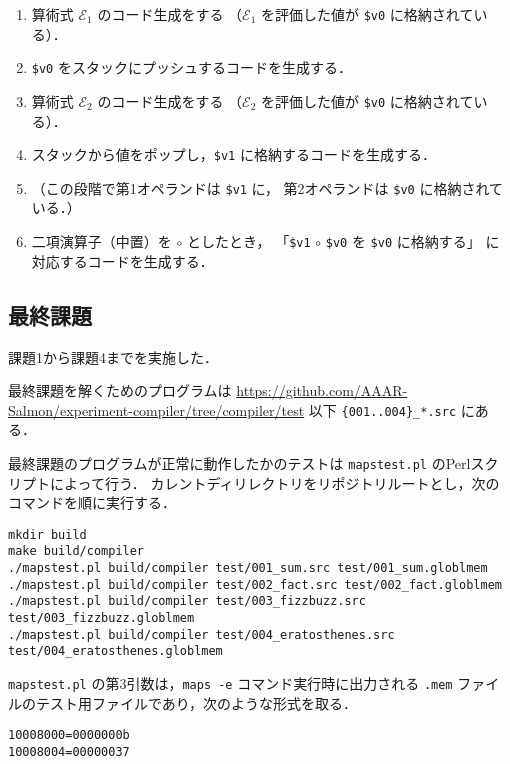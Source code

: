 \documentclass[lualatex, a4paper, ja=standard]{bxjsarticle}
\begin{document}
\begin{enumerate}
  \item 算術式 $\mathcal{E}_1$ のコード生成をする
  （$\mathcal{E}_1$ を評価した値が \verb|$v0| に格納されている）．
  \item \verb|$v0| をスタックにプッシュするコードを生成する．
  \item 算術式 $\mathcal{E}_2$ のコード生成をする
  （$\mathcal{E}_2$ を評価した値が \verb|$v0| に格納されている）．
  \item スタックから値をポップし，\verb|$v1| に格納するコードを生成する．
  \item （この段階で第1オペランドは \verb|$v1| に，
  第2オペランドは \verb|$v0| に格納されている．）
  \item 二項演算子（中置）を $\circ$ としたとき，
  「\verb|$v1| $\circ$ \verb|$v0| を \verb|$v0| に格納する」
  に対応するコードを生成する．
\end{enumerate}

\subsection{最終課題}

課題1から課題4までを実施した．

最終課題を解くためのプログラムは
\url{https://github.com/AAAR-Salmon/experiment-compiler/tree/compiler/test}
以下 \verb|{001..004}_*.src| にある．

最終課題のプログラムが正常に動作したかのテストは
\verb|mapstest.pl| のPerlスクリプトによって行う．
カレントディリレクトリをリポジトリルートとし，次のコマンドを順に実行する．
\begin{Verbatim}[frame=lines]
mkdir build
make build/compiler
./mapstest.pl build/compiler test/001_sum.src test/001_sum.globlmem
./mapstest.pl build/compiler test/002_fact.src test/002_fact.globlmem
./mapstest.pl build/compiler test/003_fizzbuzz.src test/003_fizzbuzz.globlmem
./mapstest.pl build/compiler test/004_eratosthenes.src test/004_eratosthenes.globlmem
\end{Verbatim}

\verb|mapstest.pl| の第3引数は，\verb|maps -e| コマンド実行時に出力される
\verb|.mem| ファイルのテスト用ファイルであり，次のような形式を取る．
\begin{Verbatim}[frame=lines, label=test/001_sum.globlmem]
10008000=0000000b
10008004=00000037
\end{Verbatim}
\end{document}
